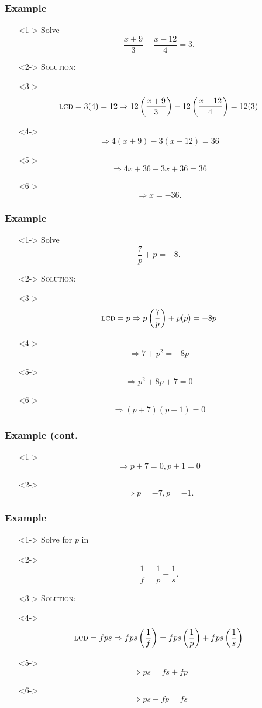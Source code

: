 \documentclass[handout]{beamer}
\begin{document}
\begin{frame}
	\frametitle{Example}
	\begin{enumerate}
		\item[]<1-> Solve 
		\[
			\frac{x+9}{3}-\frac{x-12}{4}=3. 
		\]
		\item[]<2-> \textsc{Solution:} 
		\item[]<3-> \[ \text{\textsc{lcd}}=3(4)=12 \Rightarrow 12 \left( \frac{x+9}{3} \right)-12\left( \frac{x-12}{4} \right)=12(3)  \]
		\item[]<4-> \[ \Rightarrow 4(x+9)-3(x-12)=36\] 
		\item[]<5-> \[ \Rightarrow 4x+36-3x+36=36 \] 
		\item[]<6-> \[ \Rightarrow x=-36. \] 
	\end{enumerate}
\end{frame}

\begin{frame}
	\frametitle{Example} 
	\begin{enumerate}
		\item[]<1-> Solve 
		\[
			\frac{7}{p}+p=-8. 
		\]
		\item[]<2-> \textsc{Solution:} 
		\item[]<3-> \[ \text{\textsc{lcd}}=p \Rightarrow p \left( \frac{7}{p} \right) +p(p)=-8p \]  
		\item[]<4-> \[ \Rightarrow 7+p^{2}=-8p \] 
		\item[]<5-> \[ \Rightarrow p^{2}+8p+7=0 \] 
		\item[]<6-> \[ \Rightarrow (p+7)(p+1)=0 \] 
	\end{enumerate}
\end{frame}

\begin{frame}
	\frametitle{Example (cont.} 
	\begin{enumerate} 
		\item[]<1-> \[ \Rightarrow p+7=0, p+1=0 \] 
		\item[]<2-> \[\Rightarrow p=-7, p=-1. \] 
	\end{enumerate}
\end{frame}

\begin{frame}
	\frametitle{Example}
	\begin{enumerate}
		\item[]<1-> Solve for $p$ in 
		\item[]<2-> \[ \frac{1}{f}=\frac{1}{p}+\frac{1}{s}. \] 
		\item[]<3-> \textsc{Solution:} 
		\item[]<4-> \[ \text{\textsc{lcd}}=fps \Rightarrow fps \left( \frac{1}{f}\right) =fps \left( \frac{1}{p} \right)+fps \left( \frac{1}{s}  \right)\] 
		\item[]<5-> \[ \Rightarrow ps=fs+fp \] 
		\item[]<6-> \[ \Rightarrow ps-fp=fs \] 
	\end{enumerate}
\end{frame}
\end{document}
